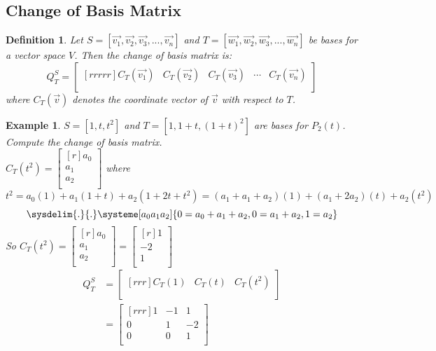 \documentclass{report}
\newtheorem*{ex}{Example}
\newtheorem*{defn}{Definition}
\begin{document}
\subsection{Change of Basis Matrix}
\begin{defn}
Let $S=[\vec{v_1},\vec{v_2},\vec{v_3},...,\vec{v_n}]$ and $T=[\vec{w_1},\vec{w_2},\vec{w_3},...,\vec{w_n}]$ be bases for a vector space $V$. Then the change of basis matrix is:
\[ Q_T^S = \begin{bmatrix}[rrrrr]C_T(\vec{v_1})&C_T(\vec{v_2})&C_T(\vec{v_3})& \cdots& C_T(\vec{v_n})\\\end{bmatrix} \]
where $C_T(\vec{v})$ denotes the coordinate vector of $\vec{v}$ with respect to $T$. 
\end{defn}
\begin{ex}
$S=[1,t,t^2]$ and $T=[1,1+t,(1+t)^2]$ are bases for $P_2(t)$. Compute the change of basis matrix.\\
$C_T(t^2) = \begin{bmatrix}[r]a_0\\a_1\\a_2\\\end{bmatrix}$ where $t^2 = a_0(1)+a_1(1+t)+a_2(1+2t+t^2) = (a_1+a_1+a_2)(1)+(a_1+2a_2)(t)+a_2(t^2)$
\[ \sysdelim{.}{.}\systeme[a_0a_1a_2]{0=a_0+a_1+a_2,0=a_1+a_2,1=a_2} \]
So $C_T(t^2) = \begin{bmatrix}[r]a_0\\a_1\\a_2\\\end{bmatrix} = \begin{bmatrix}[r]1\\-2\\1\\\end{bmatrix}$
\begin{align*}
Q_T^S &= \begin{bmatrix}[rrr]C_T(1) & C_T(t) & C_T(t^2)\\\end{bmatrix}\\
&=\begin{bmatrix}[rrr]1&-1&1\\0&1&-2\\0&0&1\\\end{bmatrix}
\end{align*} 
\end{ex}
\end{document}
